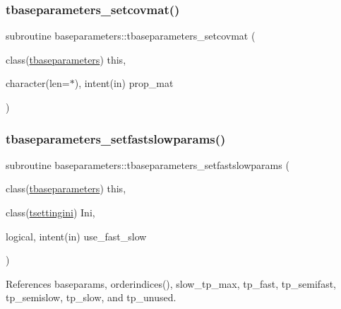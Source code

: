 \mbox{\label{namespacebaseparameters_acc7b955531e3ac266fd197c8cc09ae50}} 
\subsubsection{\texorpdfstring{tbaseparameters\+\_\+setcovmat()}{tbaseparameters\_setcovmat()}}
{\footnotesize\ttfamily subroutine baseparameters\+::tbaseparameters\+\_\+setcovmat (\begin{DoxyParamCaption}\item[{class(\mbox{\hyperlink{structbaseparameters_1_1tbaseparameters}{tbaseparameters}})}]{this,  }\item[{character(len=$\ast$), intent(in)}]{prop\+\_\+mat }\end{DoxyParamCaption})\hspace{0.3cm}{\ttfamily [private]}}

\mbox{\label{namespacebaseparameters_ac8f2cdce695f77b0f9cc3c2e86a9c05f}} 
\subsubsection{\texorpdfstring{tbaseparameters\+\_\+setfastslowparams()}{tbaseparameters\_setfastslowparams()}}
{\footnotesize\ttfamily subroutine baseparameters\+::tbaseparameters\+\_\+setfastslowparams (\begin{DoxyParamCaption}\item[{class(\mbox{\hyperlink{structbaseparameters_1_1tbaseparameters}{tbaseparameters}})}]{this,  }\item[{class(\mbox{\hyperlink{structsettings_1_1tsettingini}{tsettingini}})}]{Ini,  }\item[{logical, intent(in)}]{use\+\_\+fast\+\_\+slow }\end{DoxyParamCaption})}



References baseparams, orderindices(), slow\+\_\+tp\+\_\+max, tp\+\_\+fast, tp\+\_\+semifast, tp\+\_\+semislow, tp\+\_\+slow, and tp\+\_\+unused.

